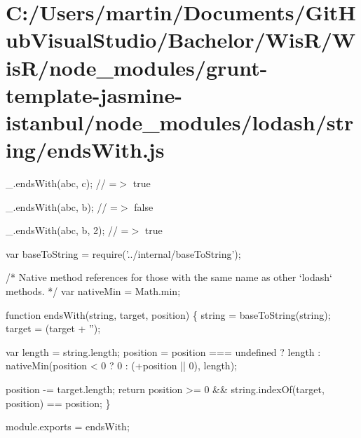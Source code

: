 \hypertarget{_c_1_2_users_2martin_2_documents_2_git_hub_visual_studio_2_bachelor_2_wis_r_2_wis_r_2node_moduleaad19f3147e59a1ddb303eb614a390f2}{}\section{C\+:/\+Users/martin/\+Documents/\+Git\+Hub\+Visual\+Studio/\+Bachelor/\+Wis\+R/\+Wis\+R/node\+\_\+modules/grunt-\/template-\/jasmine-\/istanbul/node\+\_\+modules/lodash/string/ends\+With.\+js}
\+\_\+.\+ends\+With(\textquotesingle{}abc\textquotesingle{}, \textquotesingle{}c\textquotesingle{}); // =$>$ true

\+\_\+.\+ends\+With(\textquotesingle{}abc\textquotesingle{}, \textquotesingle{}b\textquotesingle{}); // =$>$ false

\+\_\+.\+ends\+With(\textquotesingle{}abc\textquotesingle{}, \textquotesingle{}b\textquotesingle{}, 2); // =$>$ true


\begin{DoxyCodeInclude}
var baseToString = require(\textcolor{stringliteral}{'../internal/baseToString'});

\textcolor{comment}{/* Native method references for those with the same name as other `lodash` methods. */}
var nativeMin = Math.min;

\textcolor{keyword}{function} endsWith(\textcolor{keywordtype}{string}, target, position) \{
  \textcolor{keywordtype}{string} = baseToString(\textcolor{keywordtype}{string});
  target = (target + \textcolor{stringliteral}{''});

  var length = \textcolor{keywordtype}{string}.length;
  position = position === undefined
    ? length
    : nativeMin(position < 0 ? 0 : (+position || 0), length);

  position -= target.length;
  \textcolor{keywordflow}{return} position >= 0 && \textcolor{keywordtype}{string}.indexOf(target, position) == position;
\}

module.exports = endsWith;
\end{DoxyCodeInclude}
 